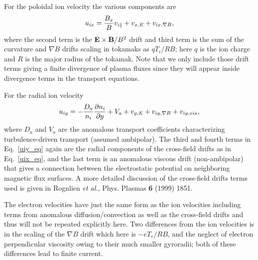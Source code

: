 \documentclass [12pt]{article}
\begin{document}

For the poloidal ion velocity the various components are
\begin{equation}
\label{uix_eq}
  u_{ix} = {B_x \over B} v_{i\|} + v_{x,E} + v_{ix,\nabla B},
\end{equation}
where the second term is the ${\bf E} \times {\bf B} / B^2$ drift and third
term is the sum of the curvature and $\nabla B$ drifts scaling in tokamaks as
$qT_i/RB$; here $q$ is the ion charge and $R$ is the major radius of the
tokamak.  Note that we only include those drift terms giving a finite
divergence of plasma fluxes since they will appear inside divergence terms in
the transport equations.

For the radial ion velocity
\begin{equation}
\label{uiy_eq}
  u_{iy}= - {D_a\over n_i} {\partial n_i \over \partial y} + V_a
           + v_{y,E} + v_{iy,\nabla B} + v_{iy,vis} ,
\end{equation} 
where $D_a$ and $V_a$ are the anomalous transport coefficients
characterizing turbulence-driven transport (assumed ambipolar).  
The third and fourth terms in Eq.~\ref {uiy_eq} again are the
radial components of the cross-field drifts as in Eq.~\ref{uix_eq}, and the
last term is an anomalous viscous drift (non-ambipolar) that gives a connection
between the electrostatic potential on neighboring magnetic flux surfaces.  A 
more detailed
discussion of the cross-field drifts terms used is given in Rognlien {\it et al.},
Phys. Plasmas {\bf 6} (1999) 1851.

The electron velocities have just the same form as the ion velocities including
terms from anomalous diffusion/convection as well as the cross-field drifts and
thus will not be repeated explicitly here.  Two differences from the ion velocities
is in the scaling of the $\nabla B$ drift which here is $-eT_e/RB$, and the
neglect of electron perpendicular viscosity owing to their much smaller gyroradii;
both of these differences lead to finite current.
\end{document}
